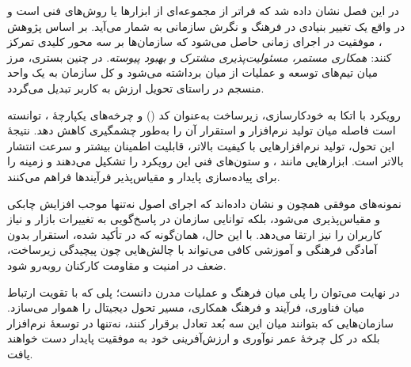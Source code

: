
در این فصل نشان داده شد که  فراتر از مجموعه‌ای از ابزارها یا روش‌های فنی است و در واقع یک تغییر بنیادی در فرهنگ و نگرش سازمانی به شمار می‌آید. بر اساس پژوهش \cite{Jha2023}، موفقیت در اجرای  زمانی حاصل می‌شود که سازمان‌ها بر سه محور کلیدی تمرکز کنند: \textit{همکاری مستمر، مسئولیت‌پذیری مشترک و بهبود پیوسته}. در چنین بستری، مرز میان تیم‌های توسعه و عملیات از میان برداشته می‌شود و کل سازمان به یک واحد منسجم در راستای تحویل ارزش به کاربر تبدیل می‌گردد.

رویکرد  با اتکا به خودکارسازی، زیرساخت به‌عنوان کد () و چرخه‌های یکپارچهٔ ، توانسته است فاصله میان تولید نرم‌افزار و استقرار آن را به‌طور چشمگیری کاهش دهد. نتیجهٔ این تحول، تولید نرم‌افزارهایی با کیفیت بالاتر، قابلیت اطمینان بیشتر و سرعت انتشار بالاتر است. ابزارهایی مانند ،  و  ستون‌های فنی این رویکرد را تشکیل می‌دهند و زمینه را برای پیاده‌سازی پایدار و مقیاس‌پذیر فرآیندها فراهم می‌کنند.

نمونه‌های موفقی همچون  و  نشان داده‌اند که اجرای اصول  نه‌تنها موجب افزایش چابکی و مقیاس‌پذیری می‌شود، بلکه توانایی سازمان در پاسخ‌گویی به تغییرات بازار و نیاز کاربران را نیز ارتقا می‌دهد. با این حال، همان‌گونه که در \cite{Jha2023} تأکید شده، استقرار  بدون آمادگی فرهنگی و آموزشی کافی می‌تواند با چالش‌هایی چون پیچیدگی زیرساخت، ضعف در امنیت و مقاومت کارکنان روبه‌رو شود.

در نهایت می‌توان  را پلی میان فرهنگ  و عملیات مدرن دانست؛ پلی که با تقویت ارتباط میان فناوری، فرآیند و فرهنگ همکاری، مسیر تحول دیجیتال را هموار می‌سازد. سازمان‌هایی که بتوانند میان این سه بُعد تعادل برقرار کنند، نه‌تنها در توسعهٔ نرم‌افزار بلکه در کل چرخهٔ عمر نوآوری و ارزش‌آفرینی خود به موفقیت پایدار دست خواهند یافت.
